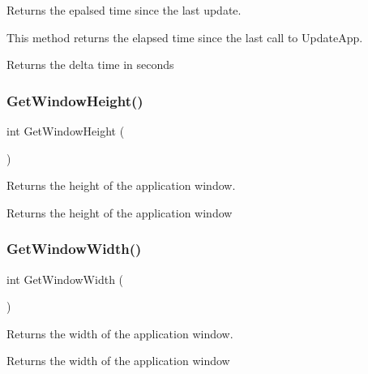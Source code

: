Returns the epalsed time since the last update.

This method returns the elapsed time since the last call to Update\+App.

\begin{DoxyReturn}{Returns}
the delta time in seconds 
\end{DoxyReturn}
\mbox{\label{group__sdl__group_gac27ddd893a70056c55278b33d7bd2c62}} 
\subsubsection{\texorpdfstring{Get\+Window\+Height()}{GetWindowHeight()}}
{\footnotesize\ttfamily int Get\+Window\+Height (\begin{DoxyParamCaption}{ }\end{DoxyParamCaption})}

Returns the height of the application window.

\begin{DoxyReturn}{Returns}
the height of the application window 
\end{DoxyReturn}
\mbox{\label{group__sdl__group_gaa938d3f784d26ccd4ed8c2d83bbc6ab4}} 
\subsubsection{\texorpdfstring{Get\+Window\+Width()}{GetWindowWidth()}}
{\footnotesize\ttfamily int Get\+Window\+Width (\begin{DoxyParamCaption}{ }\end{DoxyParamCaption})}

Returns the width of the application window.

\begin{DoxyReturn}{Returns}
the width of the application window 
\end{DoxyReturn}
\mbox{\label{group__sdl__group_ga8f43e7993cf196bb0af33a60bc93aa75}} 
